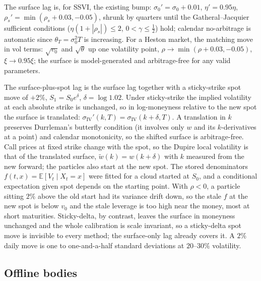 \documentclass[11pt,a4paper]{article}
\newcommand{\E}{\mathbb{E}}
\begin{document}
The surface lag is, for SSVI, the existing bump: $\sigma_0'=\sigma_0+0.01$, $\eta'=0.95\eta$, $\rho_s'=\min(\rho_s+0.03,-0.05)$, shrunk by quarters until the Gatheral--Jacquier sufficient conditions ($\eta(1+|\rho_s|)\le2$, $0<\gamma\le\tfrac12$) hold; calendar no-arbitrage is automatic since $\theta_T=\sigma_0^2T$ is increasing. For a Heston market, the matching move in vol terms: $\sqrt{v_0}$ and $\sqrt\theta$ up one volatility point, $\rho\to\min(\rho+0.03,-0.05)$, $\xi\to0.95\xi$; the surface is model-generated and arbitrage-free for any valid parameters.

The surface-plus-spot lag is the surface lag together with a sticky-strike spot move of $+2\%$, $S_1=S_0e^{\delta}$, $\delta=\log1.02$. Under sticky-strike the implied volatility at each absolute strike is unchanged, so in log-moneyness relative to the new spot the surface is translated: $\sigma_{\mathrm{IV}}'(k,T)=\sigma_{\mathrm{IV}}(k+\delta,T)$. A translation in $k$ preserves Durrleman's butterfly condition (it involves only $w$ and its $k$-derivatives at a point) and calendar monotonicity, so the shifted surface is arbitrage-free. Call prices at fixed strike change with the spot, so the Dupire local volatility is that of the translated surface, $\tilde w(k)=w(k+\delta)$ with $k$ measured from the new forward; the particles also start at the new spot. The stored denominators $f(t,x)=\E[V_t\mid X_t=x]$ were fitted for a cloud started at $S_0$, and a conditional expectation given spot depends on the starting point. With $\rho<0$, a particle sitting $2\%$ above the old start had its variance drift down, so the stale $f$ at the new spot is below $v_0$ and the stale leverage is too high near the money, most at short maturities. Sticky-delta, by contrast, leaves the surface in moneyness unchanged and the whole calibration is scale invariant, so a sticky-delta spot move is invisible to every method; the surface-only lag already covers it. A $2\%$ daily move is one to one-and-a-half standard deviations at $20$--$30\%$ volatility.

\subsection{Offline bodies}\label{sec:suite-bodies}
\end{document}
